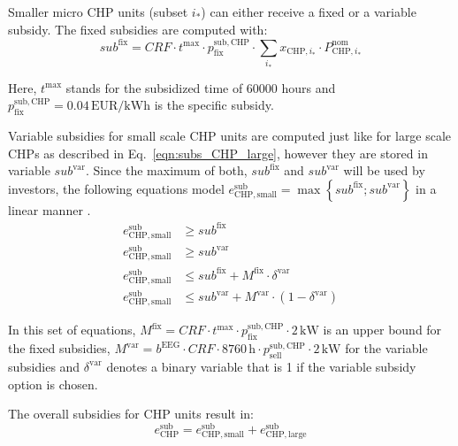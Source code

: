 Smaller micro CHP units (subset $i_*$) can either receive a fixed or a variable subsidy.
The fixed subsidies are computed with:
\begin{equation}
	sub^\mathrm{fix} = CRF \cdot t^\mathrm{max} \cdot p^\mathrm{sub,CHP}_{\mathrm{fix}} \cdot \sum\limits_{i_*} x_{\mathrm{CHP,}i_*} \cdot P^\mathrm{nom}_{\mathrm{CHP,}i_*}
\end{equation}

Here, $t^\mathrm{max}$ stands for the subsidized time of 60000 hours and $p^\mathrm{sub,CHP}_{\mathrm{fix}}=0.04\,\mathrm{EUR}/\mathrm{kWh}$ is the specific subsidy.

Variable subsidies for small scale CHP units are computed just like for large scale CHPs as described in Eq.~\ref{eqn:subs_CHP_large}, however they are stored in variable $sub^\mathrm{var}$.
Since the maximum of both, $sub^\mathrm{fix}$ and $sub^\mathrm{var}$ will be used by investors, the following equations model $e^\mathrm{sub}_{\mathrm{CHP,small}} = \max\left\lbrace sub^\mathrm{fix}; sub^\mathrm{var} \right\rbrace$ in a linear manner \cite{Williams2013}.
\begin{align}
	e^\mathrm{sub}_{\mathrm{CHP,small}} &\ge sub^\mathrm{fix}\\
	e^\mathrm{sub}_{\mathrm{CHP,small}} &\ge sub^\mathrm{var}\\
	e^\mathrm{sub}_{\mathrm{CHP,small}} &\le sub^\mathrm{fix} + M^\mathrm{fix} \cdot \delta^\mathrm{var}\\
	e^\mathrm{sub}_{\mathrm{CHP,small}} &\le sub^\mathrm{var} + M^\mathrm{var} \cdot \left(1 - \delta^\mathrm{var} \right)
\end{align}

In this set of equations, $M^\mathrm{fix} = CRF \cdot t^\mathrm{max} \cdot p^\mathrm{sub,CHP}_{\mathrm{fix}} \cdot 2\,\mathrm{kW}$ is an upper bound for the fixed subsidies, $M^\mathrm{var} = b^\mathrm{EEG} \cdot CRF \cdot 8760\,\mathrm{h} \cdot p^\mathrm{sub,CHP}_{\mathrm{sell}} \cdot 2\,\mathrm{kW}$ for the variable subsidies and $\delta^\mathrm{var}$ denotes a binary variable that is 1 if the variable subsidy option is chosen.

The overall subsidies for CHP units result in:
\begin{equation}
	e^\mathrm{sub}_{\mathrm{CHP}} = e^\mathrm{sub}_{\mathrm{CHP,small}} + e^\mathrm{sub}_{\mathrm{CHP,large}}
\end{equation}

